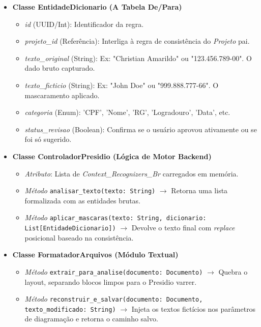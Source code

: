 \documentclass{scrreprt}
\begin{document}
\begin{itemize}
    \item \textbf{Classe EntidadeDicionario (A Tabela De/Para)}
    \begin{itemize}
        \item \textit{id} (UUID/Int): Identificador da regra.
        \item \textit{projeto\_id} (Referência): Interliga à regra de consistência do \textit{Projeto} pai.
        \item \textit{texto\_original} (String): Ex: "Christian Amarildo" ou "123.456.789-00". O dado bruto capturado.
        \item \textit{texto\_ficticio} (String): Ex: "John Doe" ou "999.888.777-66". O mascaramento aplicado.
        \item \textit{categoria} (Enum): 'CPF', 'Nome', 'RG', 'Logradouro', 'Data', etc.
        \item \textit{status\_revisao} (Boolean): Confirma se o usuário aprovou ativamente ou se foi só sugerido.
    \end{itemize}

    \item \textbf{Classe ControladorPresidio (Lógica de Motor Backend)}
    \begin{itemize}
        \item \textit{Atributo}: Lista de \textit{Context\_Recognizers\_Br} carregados em memória.
        \item \textit{Método} \texttt{analisar\_texto(texto: String)} $\rightarrow$ Retorna uma lista formalizada com as entidades brutas.
        \item \textit{Método} \texttt{aplicar\_mascaras(texto: String, dicionario: List[EntidadeDicionario])} $\rightarrow$ Devolve o texto final com \textit{replace} posicional baseado na consistência.
    \end{itemize}

    \item \textbf{Classe FormatadorArquivos (Módulo Textual)}
    \begin{itemize}
        \item \textit{Método} \texttt{extrair\_para\_analise(documento: Documento)} $\rightarrow$ Quebra o layout, separando blocos limpos para o Presidio varrer.
        \item \textit{Método} \texttt{reconstruir\_e\_salvar(documento: Documento, texto\_modificado: String)} $\rightarrow$ Injeta os textos fictícios nos parâmetros de diagramação e retorna o caminho salvo.
    \end{itemize}
\end{itemize}
\end{document}
